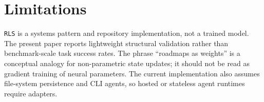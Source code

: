 \documentclass{article}
\newcommand{\ours}{\texttt{RLS}}
\theoremstyle{plain}
\theoremstyle{definition}
\theoremstyle{remark}
\begin{document}
\section*{Limitations}
\ours{} is a systems pattern and repository implementation, not a trained model. The present paper reports lightweight structural validation rather than benchmark-scale task success rates. The phrase ``roadmaps as weights'' is a conceptual analogy for non-parametric state updates; it should not be read as gradient training of neural parameters. The current implementation also assumes file-system persistence and CLI agents, so hosted or stateless agent runtimes require adapters.




\newpage
\appendix
\onecolumn

\end{document}
